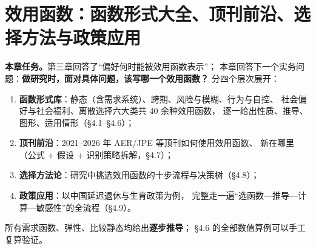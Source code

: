 



\chapter{效用函数：函数形式大全、顶刊前沿、选择方法与政策应用}

\noindent\textbf{本章任务。}第三章回答了“偏好何时能被效用函数表示”；
本章回答下一个实务问题：\textbf{做研究时，面对具体问题，该写哪一个效用函数？}
分四个层次展开：
\begin{enumerate}
  \item \textbf{函数形式库}：静态（含需求系统）、跨期、风险与模糊、行为与自控、
        社会偏好与社会福利、离散选择六大类共 40 余种效用函数，
        逐一给出性质、推导、图形、适用情形（§4.1--§4.6）；
  \item \textbf{顶刊前沿}：2021--2026 年 AER/JPE 等顶刊如何使用效用函数、
        新在哪里（公式 + 假设 + 识别策略拆解，§4.7）；
  \item \textbf{选择方法论}：研究中挑选效用函数的十步流程与决策树（§4.8）；
  \item \textbf{政策应用}：以中国延迟退休与生育政策为例，
        完整走一遍“选函数—推导—计算—敏感性”的全流程（§4.9）。
\end{enumerate}

\noindent 所有需求函数、弹性、比较静态均给出\textbf{逐步推导}；
§4.6 的全部数值算例可以手工复算验证。

\tableofcontents
\clearpage














